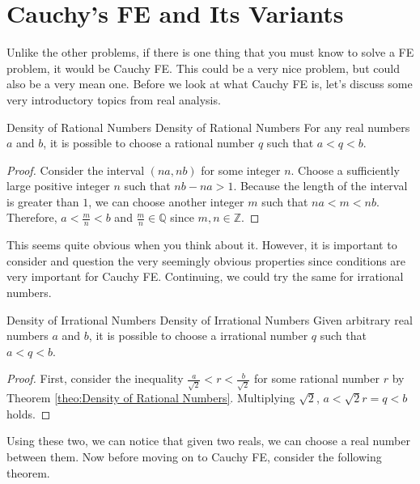 \documentclass[../../main.tex]{subfiles}
\begin{document}
\section{Cauchy's FE and Its Variants}

Unlike the other problems, if there is one thing that you must
know to solve a FE problem, it would be Cauchy FE. This could
be a very nice problem, but could also be a very mean one.
Before we look at what Cauchy FE is, let's discuss some very
introductory topics from real analysis.

\begin{theorem}
{Density of Rational Numbers}
{Density of Rational Numbers}
For any real numbers $a$ and $b$, it is possible to choose
a rational number $q$ such that $a < q < b$.
\end{theorem}
\begin{proof}
Consider the interval $(na, nb)$ for some integer $n$. Choose a
sufficiently large positive integer $n$ such that $nb - na > 1$.
Because the length of the interval is greater than $1$, we can
choose another integer $m$ such that $na < m < nb$. Therefore,
$a < \frac{m}{n} < b$ and $\frac{m}{n} \in \mathbb{Q}$ since
$m, n \in \mathbb{Z}$.
\end{proof}

This seems quite obvious when you think about it. However,
it is important to consider and question the very seemingly obvious
properties since conditions are very important for Cauchy FE.
Continuing, we could try the same for irrational numbers.

\begin{theorem}
{Density of Irrational Numbers}
{Density of Irrational Numbers}
Given arbitrary real numbers $a$ and $b$, it is possible
to choose a irrational number $q$ such that $a < q < b$.
\end{theorem}
\begin{proof}
First, consider the inequality $\frac{a}{\sqrt{2}} < r <
\frac{b}{\sqrt{2}}$ for some rational number $r$ by Theorem
\ref{theo:Density of Rational Numbers}. Multiplying
$\sqrt{2}$, $a < \sqrt{2} r = q < b$ holds.
\end{proof}

Using these two, we can notice that given two reals, we can
choose a real number between them. Now before moving on to
Cauchy FE, consider the following theorem.
\end{document}
